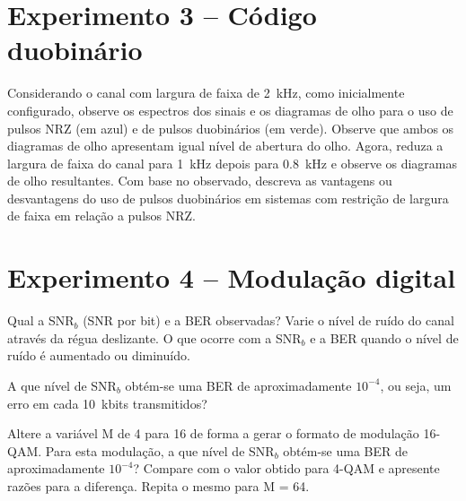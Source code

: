\documentclass[12pt,addpoints]{exam}
\begin{document}
\section*{Experimento 3 -- Código duobinário}

\begin{questions}
    \question Considerando o canal com largura de faixa de 2~kHz, como inicialmente configurado, observe os espectros dos sinais e os diagramas de olho para o uso de pulsos NRZ (em azul) e de pulsos duobinários (em verde). Observe que ambos os diagramas de olho apresentam igual nível de abertura do olho. Agora, reduza a largura de faixa do canal para 1~kHz depois para 0.8~kHz e observe os diagramas de olho resultantes. Com base no observado, descreva as vantagens ou desvantagens do uso de pulsos duobinários em sistemas com restrição de largura de faixa em relação a pulsos NRZ.
    \fillwithlines{0.75in}
\end{questions}

\section*{Experimento 4 -- Modulação digital}

\begin{questions}
    \question Qual a SNR$_b$ (SNR por bit) e a BER observadas? Varie o nível de ruído do canal através da régua deslizante. O que ocorre com a SNR$_b$ e a BER quando o nível de ruído é aumentado ou diminuído.
    \fillwithlines{0.75in}
    
    \question A que nível de SNR$_b$ obtém-se uma BER de aproximadamente $10^{-4}$, ou seja, um erro em cada 10~kbits transmitidos?
    \fillwithlines{0.25in}
    
    \question Altere a variável M de 4 para 16 de forma a gerar o formato de modulação 16-QAM. Para esta modulação, a que nível de SNR$_b$ obtém-se uma BER de aproximadamente $10^{-4}$? Compare com o valor obtido para 4-QAM e apresente razões para a diferença. Repita o mesmo para M = 64.
    
    \fillwithlines{1in}
\end{questions}
\end{document}
